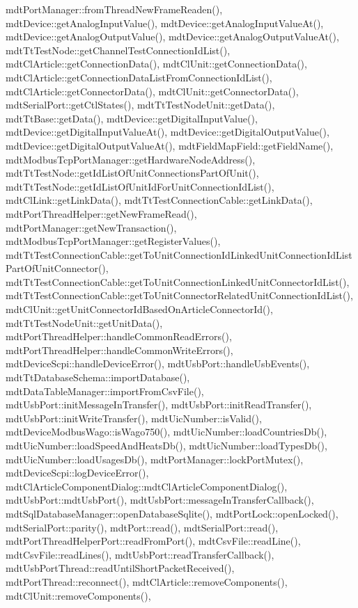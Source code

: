 mdt\-Port\-Manager\-::from\-Thread\-New\-Frame\-Readen(), mdt\-Device\-::get\-Analog\-Input\-Value(), mdt\-Device\-::get\-Analog\-Input\-Value\-At(), mdt\-Device\-::get\-Analog\-Output\-Value(), mdt\-Device\-::get\-Analog\-Output\-Value\-At(), mdt\-Tt\-Test\-Node\-::get\-Channel\-Test\-Connection\-Id\-List(), mdt\-Cl\-Article\-::get\-Connection\-Data(), mdt\-Cl\-Unit\-::get\-Connection\-Data(), mdt\-Cl\-Article\-::get\-Connection\-Data\-List\-From\-Connection\-Id\-List(), mdt\-Cl\-Article\-::get\-Connector\-Data(), mdt\-Cl\-Unit\-::get\-Connector\-Data(), mdt\-Serial\-Port\-::get\-Ctl\-States(), mdt\-Tt\-Test\-Node\-Unit\-::get\-Data(), mdt\-Tt\-Base\-::get\-Data(), mdt\-Device\-::get\-Digital\-Input\-Value(), mdt\-Device\-::get\-Digital\-Input\-Value\-At(), mdt\-Device\-::get\-Digital\-Output\-Value(), mdt\-Device\-::get\-Digital\-Output\-Value\-At(), mdt\-Field\-Map\-Field\-::get\-Field\-Name(), mdt\-Modbus\-Tcp\-Port\-Manager\-::get\-Hardware\-Node\-Address(), mdt\-Tt\-Test\-Node\-::get\-Id\-List\-Of\-Unit\-Connections\-Part\-Of\-Unit(), mdt\-Tt\-Test\-Node\-::get\-Id\-List\-Of\-Unit\-Id\-For\-Unit\-Connection\-Id\-List(), mdt\-Cl\-Link\-::get\-Link\-Data(), mdt\-Tt\-Test\-Connection\-Cable\-::get\-Link\-Data(), mdt\-Port\-Thread\-Helper\-::get\-New\-Frame\-Read(), mdt\-Port\-Manager\-::get\-New\-Transaction(), mdt\-Modbus\-Tcp\-Port\-Manager\-::get\-Register\-Values(), mdt\-Tt\-Test\-Connection\-Cable\-::get\-To\-Unit\-Connection\-Id\-Linked\-Unit\-Connection\-Id\-List\-Part\-Of\-Unit\-Connector(), mdt\-Tt\-Test\-Connection\-Cable\-::get\-To\-Unit\-Connection\-Linked\-Unit\-Connector\-Id\-List(), mdt\-Tt\-Test\-Connection\-Cable\-::get\-To\-Unit\-Connector\-Related\-Unit\-Connection\-Id\-List(), mdt\-Cl\-Unit\-::get\-Unit\-Connector\-Id\-Based\-On\-Article\-Connector\-Id(), mdt\-Tt\-Test\-Node\-Unit\-::get\-Unit\-Data(), mdt\-Port\-Thread\-Helper\-::handle\-Common\-Read\-Errors(), mdt\-Port\-Thread\-Helper\-::handle\-Common\-Write\-Errors(), mdt\-Device\-Scpi\-::handle\-Device\-Error(), mdt\-Usb\-Port\-::handle\-Usb\-Events(), mdt\-Tt\-Database\-Schema\-::import\-Database(), mdt\-Data\-Table\-Manager\-::import\-From\-Csv\-File(), mdt\-Usb\-Port\-::init\-Message\-In\-Transfer(), mdt\-Usb\-Port\-::init\-Read\-Transfer(), mdt\-Usb\-Port\-::init\-Write\-Transfer(), mdt\-Uic\-Number\-::is\-Valid(), mdt\-Device\-Modbus\-Wago\-::is\-Wago750(), mdt\-Uic\-Number\-::load\-Countries\-Db(), mdt\-Uic\-Number\-::load\-Speed\-And\-Heats\-Db(), mdt\-Uic\-Number\-::load\-Types\-Db(), mdt\-Uic\-Number\-::load\-Usages\-Db(), mdt\-Port\-Manager\-::lock\-Port\-Mutex(), mdt\-Device\-Scpi\-::log\-Device\-Error(), mdt\-Cl\-Article\-Component\-Dialog\-::mdt\-Cl\-Article\-Component\-Dialog(), mdt\-Usb\-Port\-::mdt\-Usb\-Port(), mdt\-Usb\-Port\-::message\-In\-Transfer\-Callback(), mdt\-Sql\-Database\-Manager\-::open\-Database\-Sqlite(), mdt\-Port\-Lock\-::open\-Locked(), mdt\-Serial\-Port\-::parity(), mdt\-Port\-::read(), mdt\-Serial\-Port\-::read(), mdt\-Port\-Thread\-Helper\-Port\-::read\-From\-Port(), mdt\-Csv\-File\-::read\-Line(), mdt\-Csv\-File\-::read\-Lines(), mdt\-Usb\-Port\-::read\-Transfer\-Callback(), mdt\-Usb\-Port\-Thread\-::read\-Until\-Short\-Packet\-Received(), mdt\-Port\-Thread\-::reconnect(), mdt\-Cl\-Article\-::remove\-Components(), mdt\-Cl\-Unit\-::remove\-Components(), 